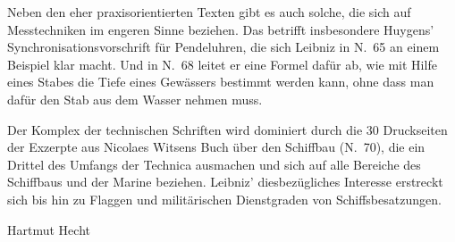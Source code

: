 Neben den eher praxisorientierten Texten gibt es auch solche, die sich auf Messtechniken im engeren Sinne beziehen. Das betrifft insbesondere Huygens' Synchronisationsvorschrift f\"{u}r Pendeluhren, die sich Leibniz in N.~65 an einem Beispiel klar macht. Und in N.~68 leitet er eine Formel daf\"{u}r ab, wie mit Hilfe eines Stabes die Tiefe eines Gew\"{a}ssers bestimmt werden kann, ohne dass man daf\"{u}r den Stab aus dem Wasser nehmen muss.\par
Der Komplex der technischen Schriften wird dominiert durch die 30 Druckseiten der Exzerpte aus Nicolaes Witsens Buch \"{u}ber den Schiffbau (N.~70), die ein Drittel des Umfangs der Technica ausmachen und sich auf alle Bereiche des Schiffbaus und der Marine beziehen. Leibniz' diesbez\"{u}gliches Interesse erstreckt sich bis hin zu Flaggen und milit\"{a}rischen Dienstgraden von Schiffsbesatzungen.\par\vspace{2.0ex}
\hfill Hartmut Hecht\par

